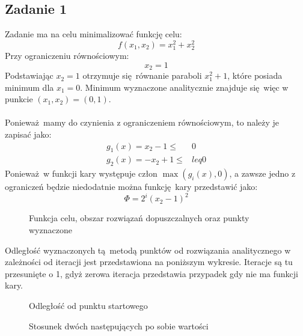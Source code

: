 \documentclass[a4paper, 12pt]{article}
\begin{document}
        \subsection{Zadanie 1}
            Zadanie ma na celu minimalizować funkcję celu:
            $$
                f(x_1, x_2) = x_1^2 + x_2^2
            $$
            Przy ograniczeniu równościowym:
            $$
                x_2 = 1
            $$
            Podstawiając $x_2 = 1$ otrzymuje się równanie paraboli $x_1^2 + 1$, które posiada minimum
            dla $x_1 = 0$. Minimum wyznaczone analitycznie znajduje się więc w punkcie $(x_1, x_2) = 
            (0, 1)$.
            \\ \\
            Ponieważ mamy do czynienia z ograniczeniem równościowym, to należy je zapisać jako:
            $$
                \begin{aligned}
                    g_1(x) = x_2 - 1 \leq& 0 \\
                    g_2(x) = -x_2 + 1 \leq& leq 0
                \end{aligned}
            $$
            Ponieważ w funkcji kary występuje człon $\max(g_i(x), 0)$, a zawsze jedno z ograniczeń
            będzie niedodatnie można funkcję kary przedstawić jako:
            $$
                \Phi = 2^i (x_2 - 1) ^ 2
            $$
            \begin{figure}[H]
                \centering
                \def \svgwidth{0.7\columnwidth}
                
                \caption{Funkcja celu, obszar rozwiązań dopuszczalnych oraz punkty wyznaczone}
            \end{figure}\noindent
            Odległość wyznaczonych tą metodą punktów od rozwiązania analitycznego w zależności od
            iteracji jest przedstawiona na poniższym wykresie. Iteracje są tu przesunięte o 1, gdyż 
            zerowa iteracja przedstawia przypadek gdy nie ma funkcji kary.
            \begin{figure}[H]
                \centering
                \def \svgwidth{0.7\columnwidth}
                
                \caption{Odległość od punktu startowego}
            \end{figure}\noindent
            \begin{figure}[H]
                \centering
                \def \svgwidth{0.7\columnwidth}
                
                \caption{Stosunek dwóch następujących po sobie wartości}
            \end{figure}\noindent
\end{document}
